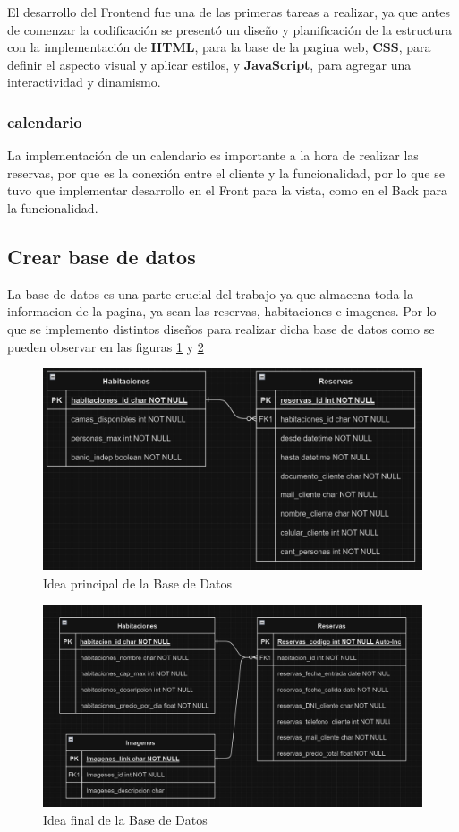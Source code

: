 El desarrollo del Frontend fue una de las primeras tareas a realizar, ya que antes de comenzar la codificación se presentó un diseño y planificación de la estructura con la implementación de \textbf{HTML}, para la base de la pagina web, \textbf{CSS}, para definir el aspecto visual y aplicar estilos, y \textbf{JavaScript}, para agregar una interactividad y dinamismo.


\subsubsection{calendario}

La implementación de un calendario es importante a la hora de realizar las reservas, por que es la conexión entre el cliente y la funcionalidad, por lo que se tuvo que implementar desarrollo en el Front para la vista, como en el Back para la funcionalidad.


\subsection{Crear base de datos}


La base de datos es una parte crucial del trabajo ya que almacena toda la informacion de la pagina, ya sean las reservas, habitaciones e imagenes. Por lo que se implemento distintos diseños para realizar dicha base de datos como se pueden observar en las figuras \ref{fig:BD1} y \ref{fig:BD2}



\begin{figure}
    \centering
    \includegraphics[width=0.75\linewidth]{images/base de datos 1.png}
    \caption{Idea principal de la Base de Datos}
    \label{fig:BD1}
\end{figure}


\begin{figure}
    \centering
    \includegraphics[width=0.75\linewidth]{images/base de datos final.png}
    \caption{Idea final de la Base de Datos}
    \label{fig:BD2}
\end{figure}


